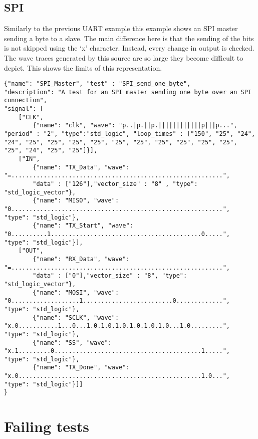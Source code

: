 \subsection{SPI}\label{appendix:more_examples:spi}
Similarly to the previous UART example this example shows an SPI master sending a byte to a slave. The main difference here is that the sending of the bits is not skipped using the ‘x’ character. Instead, every change in output is checked. The wave traces generated by this source are so large they become difficult to depict. This shows the limits of this representation.
\begin{lstlisting}[style=json, caption={Functionality test for the SPI design in appendix \ref{appendix:spi}}, label={json:spi}]
{"name": "SPI_Master", "test" : "SPI_send_one_byte",
"description": "A test for an SPI master sending one byte over an SPI connection",
"signal": [
	["CLK",
		{"name": "clk", "wave": "p..|p.||p.||||||||||||p|||p...", "period" : "2", "type":"std_logic", "loop_times" : ["150", "25", "24", "24", "25", "25", "25", "25", "25", "25", "25", "25", "25", "25", "25", "24", "25", "25"]}],
	["IN",
		{"name": "TX_Data", "wave": "=...........................................................",
		"data" : ["126"],"vector_size" : "8" , "type": "std_logic_vector"},
		{"name": "MISO", "wave": "0...........................................................", "type": "std_logic"},
		{"name": "TX_Start", "wave": "0..........1..........................................0.....", "type": "std_logic"}],
	["OUT",
		{"name": "RX_Data", "wave": "=...........................................................",
		"data" : ["0"],"vector_size" : "8", "type": "std_logic_vector"},
		{"name": "MOSI", "wave": "0...................1.........................0.............", "type": "std_logic"},
		{"name": "SCLK", "wave": "x.0...........1...0...1.0.1.0.1.0.1.0.1.0.1.0...1.0.........", "type": "std_logic"},
		{"name": "SS", "wave": "x.1.........0.........................................1.....", "type": "std_logic"},
		{"name": "TX_Done", "wave": "x.0...................................................1.0...", "type": "std_logic"}]]
}
\end{lstlisting}
\clearpage
\section{Failing tests}
